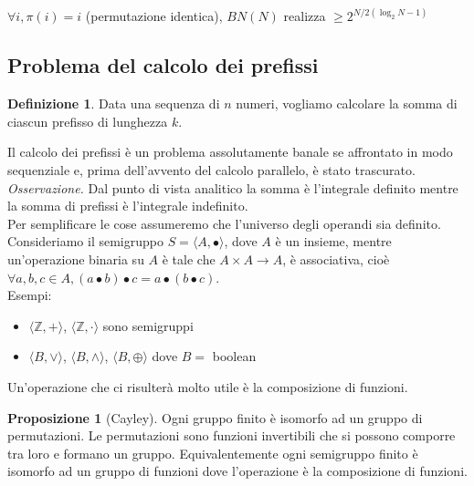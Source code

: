 \documentclass[a4paper,portrait,12pt]{article}
\theoremstyle{definition}
\newtheorem{definition}{Definizione}[section]
\newtheorem{proposition}{Proposizione}
\begin{document}
$\forall i, \pi(i) = i$ (permutazione identica), $BN(N)$ realizza $\ge 2^{N/2 (\log_2 N - 1)}$

\subsection{Problema del calcolo dei prefissi}

\begin{definition}
Data una sequenza di $n$ numeri, vogliamo calcolare la somma di ciascun prefisso di lunghezza $k$.
\end{definition}

Il calcolo dei prefissi è un problema assolutamente banale se affrontato in modo sequenziale e, prima dell'avvento del calcolo parallelo, è stato trascurato.\\

\textit{Osservazione.} Dal punto di vista analitico la somma è l'integrale definito mentre la somma di prefissi è l'integrale indefinito.\\

Per semplificare le cose assumeremo che l'universo degli operandi sia definito.\\

Consideriamo il semigruppo $S = \langle A,\bullet \rangle$, dove $A$ è un insieme, mentre un’operazione binaria su $A$ è tale che $A \times A \to A$, è associativa, cioè $\forall a,b,c \in A, (a \bullet b) \bullet c = a \bullet (b \bullet c)$.\\

Esempi:
\begin{itemize}
\item $\langle \mathbb{Z},+ \rangle$, $\langle \mathbb{Z}, \cdot \rangle$ sono semigruppi
\item $\langle B, \vee \rangle$, $\langle B, \wedge \rangle$, $\langle B, \oplus \rangle$ dove $B = $ boolean
\end{itemize}

Un’operazione che ci risulterà molto utile è la composizione di funzioni.

\begin{proposition}[Cayley] Ogni gruppo finito è isomorfo ad un gruppo di permutazioni. Le permutazioni sono funzioni invertibili che si possono comporre tra loro e formano un gruppo.
Equivalentemente ogni semigruppo finito è isomorfo ad un gruppo di funzioni dove l’operazione è la composizione di funzioni.
\end{proposition}
\end{document}
